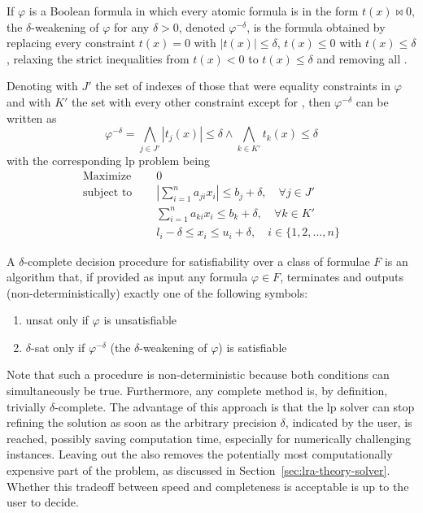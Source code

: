 \documentclass[runningheads]{llncs}
\begin{document}
\begin{definition}
    If $\varphi$ is a Boolean formula in which every atomic formula is in the form $t(x) \bowtie 0$, the $\delta$-weakening of $\varphi$ for any $\delta > 0$, denoted $\varphi^{-\delta}$, is the formula obtained by replacing every constraint $t(x) = 0$ with $|t(x)| \le \delta$, $t(x) \le 0$ with $t(x) \le \delta$, relaxing the strict inequalities from $t(x) < 0$ to $t(x) \le \delta$ and removing all \nqcs.
\end{definition}
Denoting with $J'$ the set of indexes of those that were equality constraints in $\varphi$ and with $K'$ the set with every other constraint except for \nqcs, then $\varphi^{-\delta}$ can be written as
\begin{equation*}
    \varphi^{-\delta} = \bigwedge_{j \in J'} |t_j(x)| \le \delta \wedge \bigwedge_{k \in K'} t_k(x) \le \delta
\end{equation*}
with the corresponding \gls{lp} problem being
\begin{equation}
    \label{eq:delta-lp}
    \begin{split}
        \text{Maximize }   \quad & 0                                                                                \\
        \text{subject to } \quad & \left|\sum_{i=1}^{n} a_{ji}x_{i}\right| \le b_j + \delta, \quad \forall j \in J' \\
        \quad                    & \sum_{i=1}^{n} a_{ki}x_{i} \le b_k + \delta, \quad \forall k \in K'              \\
        \quad                    & l_i - \delta \le x_i \le u_i + \delta,  \quad i \in \{1, 2, \ldots, n\}
    \end{split}
\end{equation}
\begin{definition}
    A $\delta$-complete decision procedure for satisfiability over a class of formulae $F$ is an algorithm that, if provided as input any formula $\varphi \in F$, terminates and outputs (non-deterministically) exactly one of the following symbols:
    \begin{enumerate}
        \item unsat only if $\varphi$ is unsatisfiable
        \item $\delta$-sat only if $\varphi^{-\delta}$ (the $\delta$-weakening of $\varphi$) is satisfiable
    \end{enumerate}
\end{definition}
Note that such a procedure is non-deterministic because both conditions can simultaneously be true.
Furthermore, any complete method is, by definition, trivially $\delta$-complete.
The advantage of this approach is that the \gls{lp} solver can stop refining the solution as soon as the arbitrary precision $\delta$, indicated by the user, is reached, possibly saving computation time, especially for numerically challenging instances.
Leaving out the \nqcs also removes the potentially most computationally expensive part of the problem, as discussed in Section~\ref{sec:lra-theory-solver}.
Whether this tradeoff between speed and completeness is acceptable is up to the user to decide.
\end{document}
